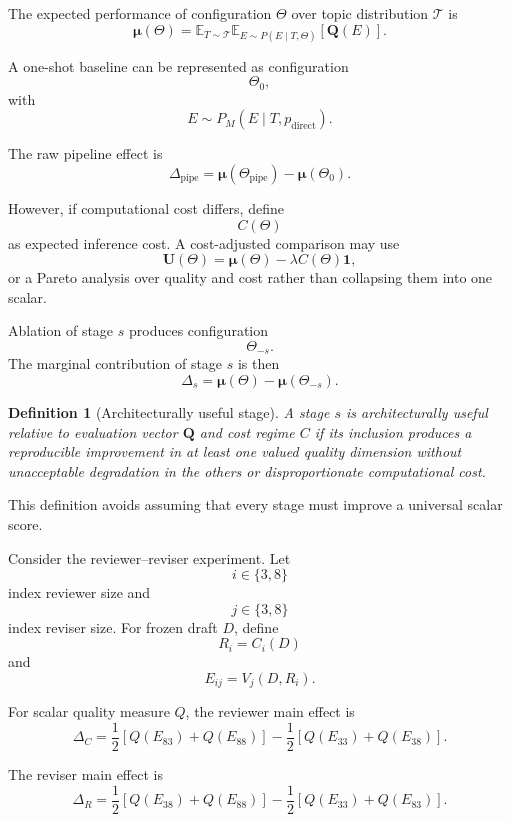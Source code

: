 \documentclass[11pt]{article}
\newtheorem{definition}{Definition}[section]
\begin{document}
The expected performance of configuration \(\Theta\) over topic distribution \(\mathcal{T}\) is
\[
    \boldsymbol{\mu}(\Theta)
    =
    \mathbb{E}_{T\sim\mathcal{T}}
    \mathbb{E}_{E\sim P(E\mid T,\Theta)}
    [\mathbf{Q}(E)].
\]

A one-shot baseline can be represented as configuration
\[
    \Theta_0,
\]
with
\[
    E\sim P_M(E\mid T,p_{\mathrm{direct}}).
\]

The raw pipeline effect is
\[
    \Delta_{\mathrm{pipe}}
    =
    \boldsymbol{\mu}(\Theta_{\mathrm{pipe}})
    -
    \boldsymbol{\mu}(\Theta_0).
\]

However, if computational cost differs, define
\[
    C(\Theta)
\]
as expected inference cost. A cost-adjusted comparison may use
\[
    \mathbf{U}(\Theta)
    =
    \boldsymbol{\mu}(\Theta)
    -
    \lambda C(\Theta)\mathbf{1},
\]
or a Pareto analysis over quality and cost rather than collapsing them into one scalar.

Ablation of stage \(s\) produces configuration
\[
    \Theta_{-s}.
\]
The marginal contribution of stage \(s\) is then
\[
    \Delta_s
    =
    \boldsymbol{\mu}(\Theta)
    -
    \boldsymbol{\mu}(\Theta_{-s}).
\]

\begin{definition}[Architecturally useful stage]
A stage \(s\) is architecturally useful relative to evaluation vector \(\mathbf{Q}\) and cost regime \(C\) if its inclusion produces a reproducible improvement in at least one valued quality dimension without unacceptable degradation in the others or disproportionate computational cost.
\end{definition}

This definition avoids assuming that every stage must improve a universal scalar score.

Consider the reviewer--reviser experiment. Let
\[
    i\in\{3,8\}
\]
index reviewer size and
\[
    j\in\{3,8\}
\]
index reviser size. For frozen draft \(D\), define
\[
    R_i=C_i(D)
\]
and
\[
    E_{ij}=V_j(D,R_i).
\]

For scalar quality measure \(Q\), the reviewer main effect is
\[
    \Delta_C
    =
    \frac{1}{2}
    \left[
        Q(E_{83})+Q(E_{88})
    \right]
    -
    \frac{1}{2}
    \left[
        Q(E_{33})+Q(E_{38})
    \right].
\]

The reviser main effect is
\[
    \Delta_R
    =
    \frac{1}{2}
    \left[
        Q(E_{38})+Q(E_{88})
    \right]
    -
    \frac{1}{2}
    \left[
        Q(E_{33})+Q(E_{83})
    \right].
\]
\end{document}
